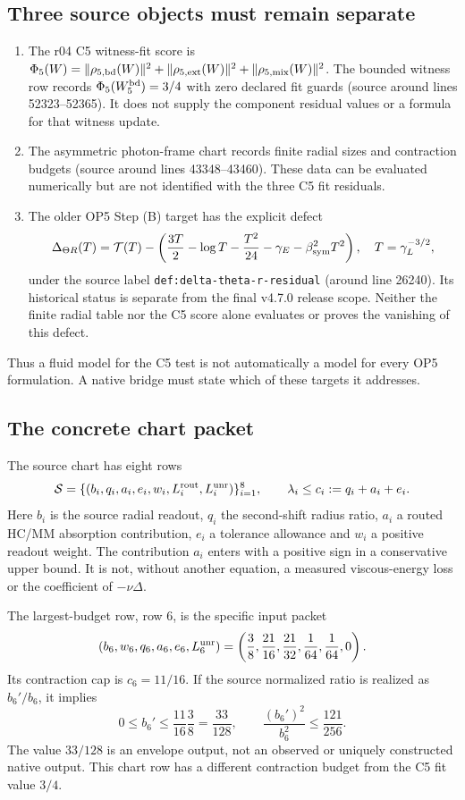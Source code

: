 \documentclass[11pt,a4paper]{article}
\begin{document}
\subsection{Three source objects must remain separate}
\begin{enumerate}
\item The r04 C5 witness-fit score is
$\Phi_5(W)=\|\rho_{5,\rm bd}(W)\|^2+
\|\rho_{5,\rm ext}(W)\|^2+\|\rho_{5,\rm mix}(W)\|^2$.
The bounded witness row records $\Phi_5(W_5^{\rm bd})=3/4$ with zero
declared fit guards (source around lines 52323--52365). It does not supply
the component residual values or a formula for that witness update.
\item The asymmetric photon-frame chart records finite radial sizes and
contraction budgets (source around lines 43348--43460). These data can be
evaluated numerically but are not identified with the three C5 fit residuals.
\item The older OP5 Step (B) target has the explicit defect
\[
\Delta_{\Theta R}(T)=\mathcal T(T)-
\left(\frac{3T}{2}-\log T-\frac{T^2}{24}
-\gamma_E-\beta_{\rm sym}^2T^2\right),
\quad T=\gamma_L^{-3/2},
\]
under the source label \texttt{def:delta-theta-r-residual}
(around line 26240). Its historical status is separate from the final
v4.7.0 release scope. Neither the finite radial table nor the C5 score
alone evaluates or proves the vanishing of this defect.
\end{enumerate}
Thus a fluid model for the C5 test is not automatically a model for every
OP5 formulation. A native bridge must state which of these targets it addresses.

\subsection{The concrete chart packet}
The source chart has eight rows
\[
\mathcal S=\{(b_i,q_i,a_i,e_i,w_i,
L_i^{\rm rout},L_i^{\rm unr})\}_{i=1}^8,
\qquad \lambda_i\le c_i:=q_i+a_i+e_i.
\]
Here $b_i$ is the source radial readout, $q_i$ the second-shift radius ratio,
$a_i$ a routed HC/MM absorption contribution, $e_i$ a tolerance allowance
and $w_i$ a positive readout weight. The contribution $a_i$ enters with a
positive sign in a conservative upper bound. It is not, without another
equation, a measured viscous-energy loss or the coefficient of $-\nu\Delta$.

The largest-budget row, row 6, is the specific input packet
\[
(b_6,w_6,q_6,a_6,e_6,L_6^{\rm unr})
=\left(\frac38,\frac{21}{16},\frac{21}{32},
\frac1{64},\frac1{64},0\right).
\]
Its contraction cap is $c_6=11/16$. If the source normalized ratio is
realized as $b_6'/b_6$, it implies
\[
0\le b_6'\le\frac{11}{16}\frac38=\frac{33}{128},
\qquad \frac{(b_6')^2}{b_6^2}\le\frac{121}{256}.
\]
The value $33/128$ is an envelope output, not an observed or uniquely
constructed native output. This chart row has a different contraction
budget from the C5 fit value $3/4$.
\end{document}
